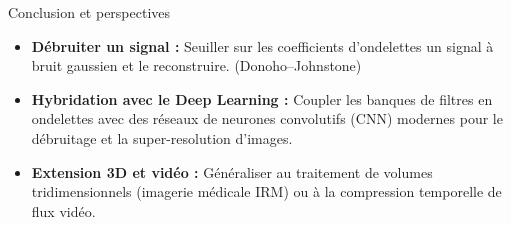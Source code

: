 \documentclass[10pt]{beamer}
\begin{document}
\begin{frame}{Conclusion et perspectives}
		\begin{itemize}
			\item[\color{rouge}\blacktriangleright]
			\textbf{Débruiter un signal :} Seuiller sur les coefficients d'ondelettes un signal à bruit gaussien et le reconstruire. (Donoho–Johnstone)
			\item[\color{rouge}\blacktriangleright] \textbf{Hybridation avec le Deep Learning :} Coupler les banques de filtres en ondelettes avec des réseaux de neurones convolutifs (CNN) modernes pour le débruitage et la super-resolution d'images.
			\item[\color{rouge}\blacktriangleright] \textbf{Extension 3D et vidéo :} Généraliser au traitement de volumes tridimensionnels (imagerie médicale IRM) ou à la compression temporelle de flux vidéo.
		\end{itemize}
	\end{frame}
	
	\appendix
	
\end{document}
